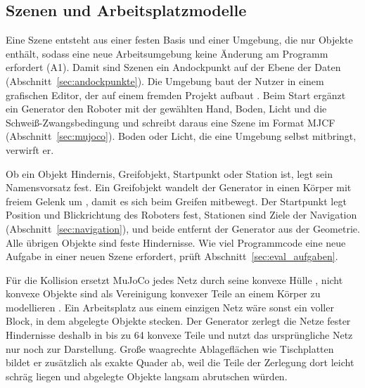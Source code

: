 \subsection{Szenen und Arbeitsplatzmodelle}
\label{sec:szenen}
Eine Szene entsteht aus einer festen Basis und einer Umgebung, die nur Objekte enthält, sodass eine neue Arbeitsumgebung keine Änderung am Programm erfordert (A1).
Damit sind Szenen ein Andockpunkt auf der Ebene der Daten (Abschnitt~\ref{sec:andockpunkte}).
Die Umgebung baut der Nutzer in einem grafischen Editor, der auf einem fremden Projekt aufbaut .
Beim Start ergänzt ein Generator den Roboter mit der gewählten Hand, Boden, Licht und die Schweiß-Zwangsbedingung und schreibt daraus eine Szene im Format MJCF (Abschnitt~\ref{sec:mujoco}).
Boden oder Licht, die eine Umgebung selbst mitbringt, verwirft er.

Ob ein Objekt Hindernis, Greifobjekt, Startpunkt oder Station ist, legt sein Namensvorsatz fest.
Ein Greifobjekt wandelt der Generator in einen Körper mit freiem Gelenk um \cite{Todorov2012}, damit es sich beim Greifen mitbewegt.
Der Startpunkt legt Position und Blickrichtung des Roboters fest, Stationen sind Ziele der Navigation (Abschnitt~\ref{sec:navigation}), und beide entfernt der Generator aus der Geometrie.
Alle übrigen Objekte sind feste Hindernisse.
Wie viel Programmcode eine neue Aufgabe in einer neuen Szene erfordert, prüft Abschnitt~\ref{sec:eval_aufgaben}.

Für die Kollision ersetzt MuJoCo jedes Netz durch seine konvexe Hülle \cite{MujocoDoku2026}, nicht konvexe Objekte sind als Vereinigung konvexer Teile an einem Körper zu modellieren \cite{MujocoDoku2026}.
Ein Arbeitsplatz aus einem einzigen Netz wäre sonst ein voller Block, in dem abgelegte Objekte stecken.
Der Generator zerlegt die Netze fester Hindernisse deshalb in bis zu 64 konvexe Teile  und nutzt das ursprüngliche Netz nur noch zur Darstellung.
Große waagrechte Ablageflächen wie Tischplatten bildet er zusätzlich als exakte Quader ab, weil die Teile der Zerlegung dort leicht schräg liegen und abgelegte Objekte langsam abrutschen würden.

